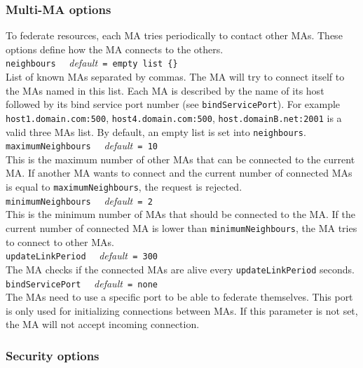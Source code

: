 \subsubsection{Multi-MA options}
\label{sec:multimaconfig}

To federate resources, each MA tries periodically to contact other MAs. These
options define how the MA connects to the others.\\

\noindent
\texttt{neighbours} \ \ \emph{default}\texttt{ = empty list \{\}}\\ List of
known MAs separated by commas. The MA will try to connect itself to the MAs
named in this list. Each MA is described by the name of its host followed by
its bind service port number (see \texttt{bindServicePort}). For example
\texttt{host1.domain.com:500}, \texttt{host4.domain.com:500},
\texttt{host.domainB.net:2001} is a valid three MAs list. By default, an empty
list is set into \texttt{neighbours}.\\

\noindent
\texttt{maximumNeighbours} \ \ \emph{default}\texttt{ = 10}\\ This is the
maximum number of other MAs that can be connected to the current MA.  If
another MA wants to connect and the current number of connected MAs is equal to
\texttt{maximumNeighbours}, the request is rejected.\\

\noindent
\texttt{minimumNeighbours} \ \ \emph{default}\texttt{ = 2}\\ This is the
minimum number of MAs that should be connected to the MA. If the current number
of connected MA is lower than \texttt{minimumNeighbours}, the MA tries to
connect to other MAs.\\

\noindent
\texttt{updateLinkPeriod} \ \ \emph{default}\texttt{ = 300}\\ The MA checks if
the connected MAs are alive every \texttt{updateLinkPeriod} seconds.\\

\noindent
\texttt{bindServicePort} \ \ \emph{default}\texttt{ = none}\\ The MAs need to
use a specific port to be able to federate themselves. This port is only used
for initializing connections between MAs. If this parameter is not set, the MA
will not accept incoming connection.\\

\subsubsection{Security options}
\label{sec:securityconfig}

